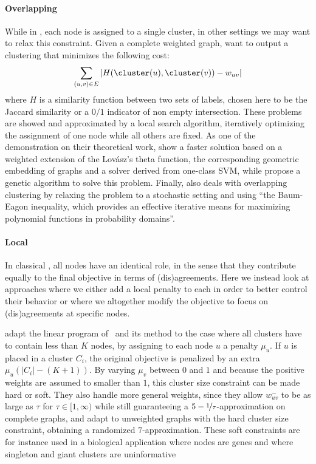 \paragraph{Overlapping \pcc{}}

While in \pcc{}, each node is assigned to a single cluster, in other settings we may want to relax
this constraint. Given a complete weighted graph, \textcite{Bonchi2012} want to output a clustering
\cluster{} that minimizes the following cost: \[ \sum_{(u,v)\in E} \left| H(\cluster(u),
\cluster(v)) - w_{uv}\right|\] where $H$ is a similarity function between two sets of labels, chosen
here to be the Jaccard similarity or a $0/1$ indicator of non empty intersection. These problems are
showed \NPc{} and approximated by a local search algorithm, iteratively optimizing the assignment of
one node while all others are fixed. As one of the demonstration on their theoretical work,
\textcite{WeightedTheta15} show a faster solution based on a weighted extension of the Lovász's
theta function, the corresponding geometric embedding of graphs and a solver derived from one-class
SVM, while \textcite{GeneticOCC14} propose a genetic algorithm to solve this problem. Finally,
\Textcite{StochasticCC13} also deals with overlapping clustering by relaxing the problem to a
stochastic setting and using \enquote{the Baum-Eagon inequality, which provides an effective
iterative means for maximizing polynomial functions in probability domains}.

\paragraph{Local \pcc{}}

In classical \pcc{}, all nodes have an identical role, in the sense that they contribute equally to
the final objective in terms of (dis)agreements. Here we instead look at approaches where we either
add a local penalty to each in order to better control their behavior or where we altogether modify
the objective to focus on (dis)agreements at specific nodes.

\Textcite{Puleo2014} adapt the linear program of~\autocite{Charikar2003} and its \regionGrow{}
method to the case
where all clusters have to contain less than $K$ nodes, by assigning to each node $u$ a penalty
$\mu_u$. If $u$ is placed in a cluster $C_i$, the original \mind{} objective is penalized by an
extra $\mu_u\left(|C_i| - (K+1)\right)$. By varying $\mu_v$ between $0$ and $1$ and because the
positive weights are assumed to smaller than $1$, this cluster size constraint can be made hard or
soft. They also handle more general weights, since they allow $w^-_{uv}$ to be as large as $\tau$
for $\tau\in [1,\infty)$ while still guaranteeing a $5-\nicefrac{1}{\tau}$-approximation on complete
graphs, and adapt \ccpivot{} to unweighted graphs with the hard cluster size constraint, obtaining a
randomized $7$-approximation.
These soft constraints are for instance used in a biological application where nodes are genes and
where singleton and giant clusters are uninformative~\autocite{Hou2016}


